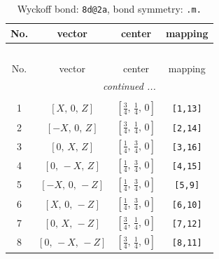 \documentclass[fleqn,8pt]{jsarticle}
\begin{document}
\begin{longtable}{cccc}
\caption{Wyckoff bond: {\tt 8d@2a}, bond symmetry: {\tt .m.}}
 \\
 \hline \hline
No. & vector & center & mapping \\ \hline \endfirsthead

\multicolumn{3}{l}{\tablename\ \thetable{}} \\
 \hline \hline
No. & vector & center & mapping \\ \hline \endhead

 \hline \hline
\multicolumn{3}{r}{\footnotesize\it continued ...} \\ \endfoot

 \hline \hline
\multicolumn{3}{r}{} \\ \endlastfoot

1 & $\left[ X,\, 0,\, Z \right]$ & $\left[ \frac{3}{4},\, \frac{1}{4},\, 0 \right]$ & {\tt [1,13]} \\ \hline
2 & $\left[ - X,\, 0,\, Z \right]$ & $\left[ \frac{3}{4},\, \frac{1}{4},\, 0 \right]$ & {\tt [2,14]} \\ \hline
3 & $\left[ 0,\, X,\, Z \right]$ & $\left[ \frac{1}{4},\, \frac{3}{4},\, 0 \right]$ & {\tt [3,16]} \\ \hline
4 & $\left[ 0,\, - X,\, Z \right]$ & $\left[ \frac{1}{4},\, \frac{3}{4},\, 0 \right]$ & {\tt [4,15]} \\ \hline
5 & $\left[ - X,\, 0,\, - Z \right]$ & $\left[ \frac{1}{4},\, \frac{3}{4},\, 0 \right]$ & {\tt [5,9]} \\ \hline
6 & $\left[ X,\, 0,\, - Z \right]$ & $\left[ \frac{1}{4},\, \frac{3}{4},\, 0 \right]$ & {\tt [6,10]} \\ \hline
7 & $\left[ 0,\, X,\, - Z \right]$ & $\left[ \frac{3}{4},\, \frac{1}{4},\, 0 \right]$ & {\tt [7,12]} \\ \hline
8 & $\left[ 0,\, - X,\, - Z \right]$ & $\left[ \frac{3}{4},\, \frac{1}{4},\, 0 \right]$ & {\tt [8,11]} \\
\end{longtable}
\renewcommand{\arraystretch}{1.2}
\end{document}
